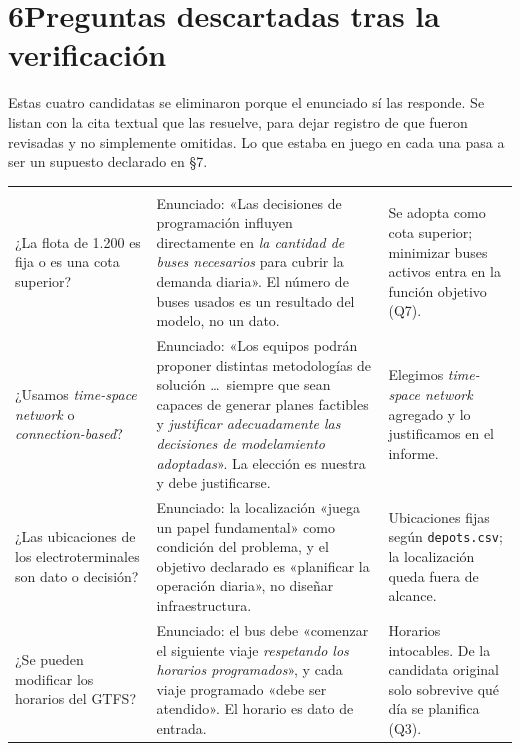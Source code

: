 \documentclass[11pt,a4paper,parskip=half]{scrartcl}
\begin{document}
\section*{6\quad Preguntas descartadas tras la verificación}

\begin{nota}
Estas cuatro candidatas se eliminaron porque el enunciado sí las responde. Se listan con la cita textual que las resuelve, para dejar registro de que fueron revisadas y no simplemente omitidas. Lo que estaba en juego en cada una pasa a ser un supuesto declarado en §7.
\end{nota}

\begin{longtable}{@{}L{3.8cm}L{7.2cm}L{3.7cm}@{}}
 &  &  \\
\endfirsthead
{}
 &  &  \\
\endhead
\midrule
¿La flota de 1.200 es fija o es una cota superior? &
Enunciado: «Las decisiones de programación influyen directamente en \textit{la cantidad de buses necesarios} para cubrir la demanda diaria». El número de buses usados es un resultado del modelo, no un dato. &
Se adopta como cota superior; minimizar buses activos entra en la función objetivo (Q7). \\
\addlinespace
{}
¿Usamos \textit{time-space network} o \textit{connection-based}? &
Enunciado: «Los equipos podrán proponer distintas metodologías de solución \ldots\ siempre que sean capaces de generar planes factibles y \textit{justificar adecuadamente las decisiones de modelamiento adoptadas}». La elección es nuestra y debe justificarse. &
Elegimos \textit{time-space network} agregado \citep{kliewer_timespacemdvsp_2006} y lo justificamos en el informe. \\
\addlinespace
¿Las ubicaciones de los electroterminales son dato o decisión? &
Enunciado: la localización «juega un papel fundamental» como condición del problema, y el objetivo declarado es «planificar la operación diaria», no diseñar infraestructura. &
Ubicaciones fijas según \texttt{depots.csv}; la localización queda fuera de alcance. \\
\addlinespace
{}
¿Se pueden modificar los horarios del GTFS? &
Enunciado: el bus debe «comenzar el siguiente viaje \textit{respetando los horarios programados}», y cada viaje programado «debe ser atendido». El horario es dato de entrada. &
Horarios intocables. De la candidata original solo sobrevive qué día se planifica (Q3). \\
\bottomrule
\end{longtable}
\end{document}
